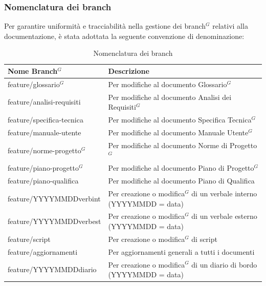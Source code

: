 \subsubsection{Nomenclatura dei branch}
\label{sec: nomenclatura-branch}
Per garantire uniformità e tracciabilità nella gestione dei branch$^G$ relativi alla documentazione, è stata adottata la seguente convenzione di denominazione:
\begin{table}[H]
    \centering
    \renewcommand{\arraystretch}{1.15}
    \begin{tabular}{|p{}|p{}|}
        \hline
        \textbf{Nome Branch$^G$} & \textbf{Descrizione} \\
        \hline
        feature/glossario$^G$ & Per modifiche al documento Glossario$^G$ \\
        \hline
        feature/analisi-requisiti & Per modifiche al documento Analisi dei Requisiti$^G$ \\
        \hline
        feature/specifica-tecnica & Per modifiche al documento Specifica Tecnica$^G$ \\
        \hline
        feature/manuale-utente & Per modifiche al documento Manuale Utente$^G$ \\
        \hline
        feature/norme-progetto$^G$ & Per modifiche al documento Norme di Progetto$^G$ \\
        \hline
        feature/piano-progetto$^G$ & Per modifiche al documento Piano di Progetto$^G$ \\
        \hline
        feature/piano-qualifica & Per modifiche al documento Piano di Qualifica\\
        \hline
        feature/YYYYMMDDverbint & Per creazione o modifica$^G$ di un verbale interno (YYYYMMDD = data) \\
        \hline
        feature/YYYYMMDDverbest & Per creazione o modifica$^G$ di un verbale esterno (YYYYMMDD = data) \\
        \hline
        feature/script & Per creazione o modifica$^G$ di script \\
        \hline
        feature/aggiornamenti & Per aggiornamenti generali a tutti i documenti \\
        \hline
        feature/YYYYMMDDdiario & Per creazione o modifica$^G$ di un diario di bordo (YYYYMMDD = data) \\
        \hline
    \end{tabular}
    \caption{Nomenclatura dei branch}
\end{table}

